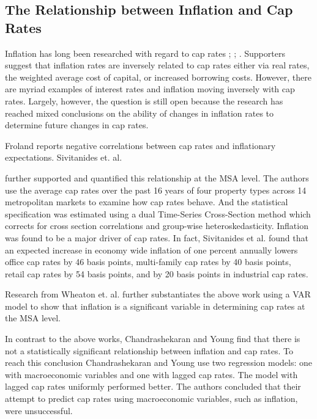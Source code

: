 \subsection{The Relationship between Inflation and Cap Rates}

Inflation has long been researched with regard to cap rates \citep*{froland1987determines}; \citep*{sivitanides2001determinants}; \citep*{chandrashekaran2000predictability}. Supporters suggest that inflation rates are inversely related to cap rates either via real rates, the weighted average  cost of capital, or increased borrowing costs. However, there are myriad examples of interest rates and inflation moving inversely with cap rates. Largely, however, the question is still open because the research has reached mixed conclusions on the ability of changes in inflation rates to determine future changes in cap rates. 

Froland \citep*{froland1987determines} reports negative correlations between cap rates and inflationary expectations. Sivitanides et. al. 

\citep*{sivitanides2001determinants} further supported and quantified this relationship at the MSA level. The authors use the average cap rates over the past 16 years of four property types across 14 metropolitan markets to examine how cap rates behave. And the statistical specification was estimated using a dual Time-Series Cross-Section method which corrects for cross section correlations and group-wise heteroskedasticity. Inflation was found to be a major driver of cap rates. In fact, Sivitanides et al. found that an expected increase in economy wide inflation of one percent annually lowers office cap rates by 46 basis points, multi-family cap rates by 40 basis points, retail cap rates by 54 basis points, and by 20 basis points in industrial cap rates.

Research from Wheaton et. al. \citep*{wheaton2001real} further substantiates the above work using a VAR model to show that inflation is a significant variable in determining cap rates at the MSA level. 

In contrast to the above works, Chandrashekaran and Young \citep*{chandrashekaran2000predictability} find that there is not a statistically significant relationship between inflation and cap rates. To reach this conclusion Chandrashekaran and Young use two regression models: one with macroeconomic variables and one with lagged cap rates. The model with lagged cap rates uniformly performed better. The authors concluded that their attempt to predict cap rates using macroeconomic variables, such as inflation, were unsuccessful. 

